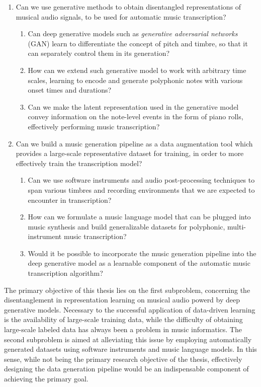 \begin{enumerate}
	\item Can we use generative methods to obtain disentangled representations of musical audio signals, to be used for automatic music transcription?
	\begin{enumerate}
		\item Can deep generative models such as \emph{generative adversarial networks} (GAN) learn to differentiate the concept of pitch and timbre, so that it can separately control them in its generation?
		\item How can we extend such generative model to work with arbitrary time scales, learning to encode and generate polyphonic notes with various onset times and durations?
		\item Can we make the latent representation used in the generative model convey information on the note-level events in the form of piano rolls, effectively performing music transcription?
	\end{enumerate}
	\item Can we build a music generation pipeline as a data augmentation tool which provides a large-scale representative dataset for training, in order to more effectively train the transcription model?
	\begin{enumerate}
		\item Can we use software instruments and audio post-processing techniques to span various timbres and recording environments that we are expected to encounter in transcription?
		\item How can we formulate a music language model that can be plugged into music synthesis and build generalizable datasets for polyphonic, multi-instrument music transcription?
		\item Would it be possible to incorporate the music generation pipeline into the deep generative model as a learnable component of the automatic music transcription algorithm?
	\end{enumerate}
\end{enumerate}

\vspace{1em}

The primary objective of this thesis lies on the first subproblem, concerning the disentanglement in representation learning on musical audio powerd by deep generative models.
Necessary to the successful application of data-driven learning is the availability of large-scale training data, while the difficulty of obtaining large-scale labeled data has always been a problem in music informatics.
The second subproblem is aimed at alleviating this issue by employing automatically generated datasets using software instruments and music language models.
In this sense, while not being the primary research objective of the thesis, effectively designing the data generation pipeline would be an indispensable component of achieving the primary goal.

